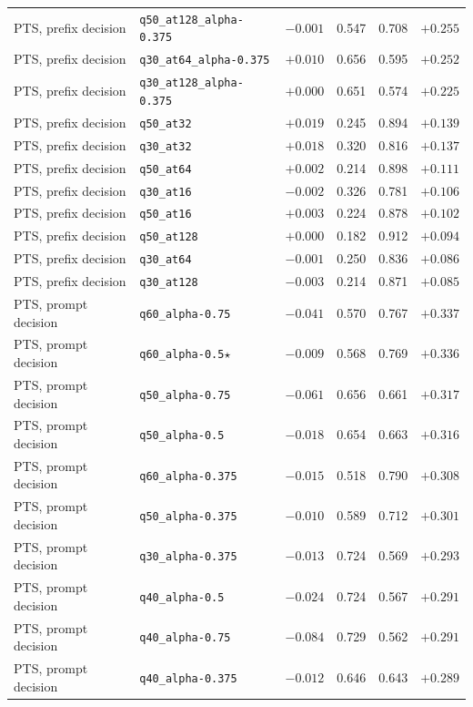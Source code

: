 {\begin{longtable}{l|l|c|cc|c}
PTS, prefix decision & \texttt{q50\_at128\_alpha-0.375} & $-0.001$ & 0.547 & 0.708 & $+0.255$ \\
PTS, prefix decision & \texttt{q30\_at64\_alpha-0.375} & $+0.010$ & 0.656 & 0.595 & $+0.252$ \\
PTS, prefix decision & \texttt{q30\_at128\_alpha-0.375} & $+0.000$ & 0.651 & 0.574 & $+0.225$ \\
PTS, prefix decision & \texttt{q50\_at32} & $+0.019$ & 0.245 & 0.894 & $+0.139$ \\
PTS, prefix decision & \texttt{q30\_at32} & $+0.018$ & 0.320 & 0.816 & $+0.137$ \\
PTS, prefix decision & \texttt{q50\_at64} & $+0.002$ & 0.214 & 0.898 & $+0.111$ \\
PTS, prefix decision & \texttt{q30\_at16} & $-0.002$ & 0.326 & 0.781 & $+0.106$ \\
PTS, prefix decision & \texttt{q50\_at16} & $+0.003$ & 0.224 & 0.878 & $+0.102$ \\
PTS, prefix decision & \texttt{q50\_at128} & $+0.000$ & 0.182 & 0.912 & $+0.094$ \\
PTS, prefix decision & \texttt{q30\_at64} & $-0.001$ & 0.250 & 0.836 & $+0.086$ \\
PTS, prefix decision & \texttt{q30\_at128} & $-0.003$ & 0.214 & 0.871 & $+0.085$ \\
PTS, prompt decision & \texttt{q60\_alpha-0.75} & $-0.041$ & 0.570 & 0.767 & $+0.337$ \\
PTS, prompt decision & \texttt{q60\_alpha-0.5}$\star$ & $-0.009$ & 0.568 & 0.769 & $+0.336$ \\
PTS, prompt decision & \texttt{q50\_alpha-0.75} & $-0.061$ & 0.656 & 0.661 & $+0.317$ \\
PTS, prompt decision & \texttt{q50\_alpha-0.5} & $-0.018$ & 0.654 & 0.663 & $+0.316$ \\
PTS, prompt decision & \texttt{q60\_alpha-0.375} & $-0.015$ & 0.518 & 0.790 & $+0.308$ \\
PTS, prompt decision & \texttt{q50\_alpha-0.375} & $-0.010$ & 0.589 & 0.712 & $+0.301$ \\
PTS, prompt decision & \texttt{q30\_alpha-0.375} & $-0.013$ & 0.724 & 0.569 & $+0.293$ \\
PTS, prompt decision & \texttt{q40\_alpha-0.5} & $-0.024$ & 0.724 & 0.567 & $+0.291$ \\
PTS, prompt decision & \texttt{q40\_alpha-0.75} & $-0.084$ & 0.729 & 0.562 & $+0.291$ \\
PTS, prompt decision & \texttt{q40\_alpha-0.375} & $-0.012$ & 0.646 & 0.643 & $+0.289$ \\

\end{longtable}}
